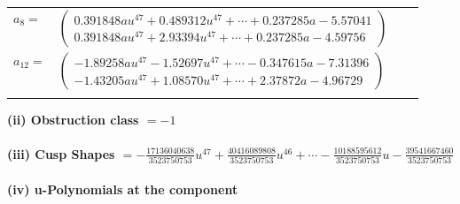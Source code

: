 \documentclass[1p]{elsarticle_modified}
\theoremstyle{definition}
\begin{document}
\begin{tabular}{m{7pt} m{180pt} m{7pt} m{180pt} }
\flushright $a_{8}=$&$\begin{pmatrix}0.391848 a u^{47}+0.489312 u^{47}+\cdots+0.237285 a-5.57041\\0.391848 a u^{47}+2.93394 u^{47}+\cdots+0.237285 a-4.59756\end{pmatrix}$ \\
\flushright $a_{12}=$&$\begin{pmatrix}-1.89258 a u^{47}-1.52697 u^{47}+\cdots-0.347615 a-7.31396\\-1.43205 a u^{47}+1.08570 u^{47}+\cdots+2.37872 a-4.96729\end{pmatrix}$\\&\end{tabular}
\flushleft \textbf{(ii) Obstruction class $= -1$}\\~\\
\flushleft \textbf{(iii) Cusp Shapes $= -\frac{17136040638}{3523750753} u^{47}+\frac{40416089808}{3523750753} u^{46}+\cdots-\frac{10188595612}{3523750753} u-\frac{39541667460}{3523750753}$}\\~\\
\newpage\renewcommand{\arraystretch}{1}
\flushleft \textbf{(iv) u-Polynomials at the component}\newline \\
\end{document}
